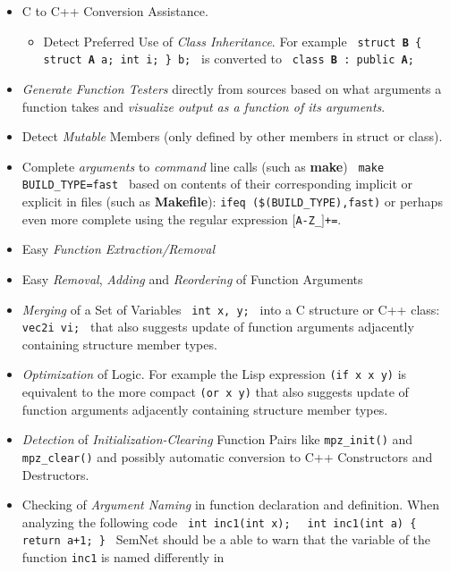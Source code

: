 \documentclass[a4paper,10pt,twocolumn]{article}
\newcommand{\sn}[0]{SemNet}
\begin{document}
\begin{itemize}
\item C to C++ Conversion Assistance.
  \begin{itemize}
  \item Detect Preferred Use of \emph{Class Inheritance}. For example \texttt{
      struct \textbf{B} \{ struct \textbf{A} a; int i; \} b; } is converted to
    \texttt{ class \textbf{B} : public \textbf{A}; } \end{itemize}
\item \emph{Generate Function Testers} directly from sources based on what
  arguments a function takes and \emph{visualize output as a function of its
    arguments}.
\item Detect \emph{Mutable} Members (only defined by other members in struct or
  class).
\item Complete \emph{arguments} to \emph{command} line calls (such as
  \textbf{make}) {\centering \texttt{ make BUILD_TYPE=fast } } based on contents
  of their corresponding implicit or explicit in files (such as
  \textbf{Makefile}): {\centering \texttt{ifeq (\$(BUILD_TYPE),fast)} } or
  perhaps even more complete using the regular expression
  \texttt{\mbox{$[$}A-Z_\mbox{$]$}+=}.
\item Easy \emph{Function Extraction/Removal}
\item Easy \emph{Removal}, \emph{Adding} and \emph{Reordering} of Function
  Arguments
\item \emph{Merging} of a Set of Variables {\centering \texttt{ int x, y; } }
  into a C structure or C++ class: {\centering \texttt{ vec2i vi; } } that also
  suggests update of function arguments adjacently containing structure member
  types.
\item \emph{Optimization} of Logic. For example the Lisp expression {\centering
    \texttt{(if x x y)} } is equivalent to the more compact {\centering \texttt{(or
      x y)} } that also suggests update of function arguments adjacently containing
  structure member types.
\item \emph{Detection} of \emph{Initialization-Clearing} Function Pairs like
  \texttt{mpz_init()} and \texttt{mpz_clear()} and possibly automatic conversion
  to C++ Constructors and Destructors.
\item Checking of \emph{Argument Naming} in function declaration and definition.
  When analyzing the following code {\centering \texttt{ int inc1(int x); }
    \texttt{ int inc1(int a) \{ return a+1; \} } } \sn{} should be a able to warn
  that the variable of the function \texttt{inc1} is named differently in

\end{itemize}
\end{document}
